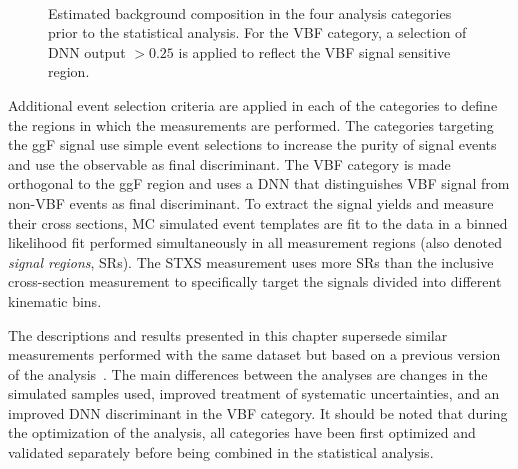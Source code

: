 \begin{figure}
     \\
    \caption{Estimated background composition in the four analysis categories prior to the statistical analysis. For the VBF \TwoJet category, a selection of DNN output $>0.25$ is applied to reflect the VBF signal sensitive region.}
    \label{fig:bkg-composition}
\end{figure}



Additional event selection criteria are applied in each of the categories to define the regions in which the measurements are performed.
The categories targeting the ggF signal use simple event selections to increase the purity of signal events and use the \mT observable as final discriminant. 
The VBF \TwoJet category is made orthogonal to the ggF \TwoJet region and uses a DNN that distinguishes VBF signal from non-VBF events as final discriminant.
To extract the signal yields and measure their cross sections, MC simulated event templates are fit to the data in a binned likelihood fit performed simultaneously in all measurement regions (also denoted \emph{signal regions}, SRs).
The STXS measurement uses more SRs than the inclusive cross-section measurement to specifically target the signals divided into different kinematic bins. 

The descriptions and results presented in this chapter supersede similar measurements performed with the same dataset but based on a previous version of the analysis~\cite{ATLAS-CONF-2021-014}.
The main differences between the analyses are changes in the simulated samples used, improved treatment of systematic uncertainties, and an improved DNN discriminant in the VBF category. 
It should be noted that during the optimization of the analysis, all categories have been first optimized and validated separately before being combined in the statistical analysis.


